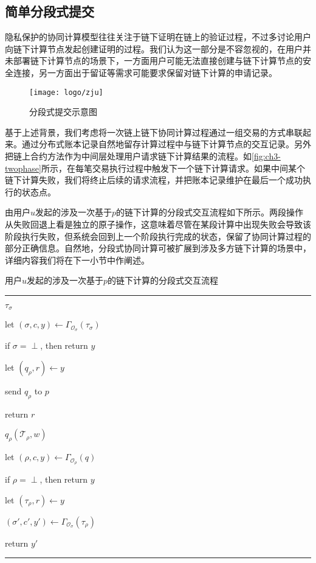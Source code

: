 \subsection{简单分段式提交}
隐私保护的协同计算模型往往关注于链下证明在链上的验证过程，不过多讨论用户向链下计算节点发起创建证明的过程。我们认为这一部分是不容忽视的，在用户并未部署链下计算节点的场景下，一方面用户可能无法直接创建与链下计算节点的安全连接，另一方面出于留证等需求可能要求保留对链下计算的申请记录。

\begin{figure}[htbp]
    \centering
    \texttt{[image: logo/zju]}
    \caption{\label{fig:ch3-twophase}分段式提交示意图}
\end{figure}

基于上述背景，我们考虑将一次链上链下协同计算过程通过一组交易的方式串联起来。通过分布式账本记录自然地留存计算过程中与链下计算节点的交互记录。另外把链上合约方法作为中间层处理用户请求链下计算结果的流程。如\autoref{fig:ch3-twophase}所示，在每笔交易执行过程中触发下一个链下计算请求。如果中间某个链下计算失败，我们将终止后续的请求流程，并把账本记录维护在最后一个成功执行的状态点。

由用户$u$发起的涉及一次基于$p$的链下计算的分段式交互流程如下所示。两段操作从失败回退上看是独立的原子操作，这意味着尽管在某段计算中出现失败会导致该阶段执行失败，但系统会回到上一个阶段执行完成的状态，保留了协同计算过程的部分正确信息。自然地，分段式协同计算可被扩展到涉及多方链下计算的场景中，详细内容我们将在下一小节中作阐述。

\begin{center}
    用户$u$发起的涉及一次基于$p$的链下计算的分段式交互流程
\end{center}
\noindent\hrule
\begin{description}
\setlength{\itemsep}{0pt}
\setlength{\parsep}{0pt}
\setlength{\parskip}{0pt}
    \item[收到来自用户$u$的交易]$\tau_\sigma$
    
    let $(\sigma, c, y) \leftarrow \Gamma_{\mathcal{O}_\sigma}(\tau_\sigma)$

    if $\sigma = \perp$, then return $y$

    let $(q_\rho, r) \leftarrow y$

    send $q_\rho$ to $p$

    return $r$
    \item[链下计算节点$p$收到请求] $q_\rho(\mathcal{T}_\rho, w)$
    
    let $(\rho, c, y) \leftarrow \Gamma_{\mathcal{O}_\rho}(q)$

    if $\rho = \perp$, then return $y$

    let $(\tau_\rho, r) \leftarrow y$
    
    $(\sigma', c', y') \leftarrow \Gamma_{\mathcal{O}_\sigma}(\tau_\rho)$

    return $y'$ 
\end{description}
\noindent\hrule

